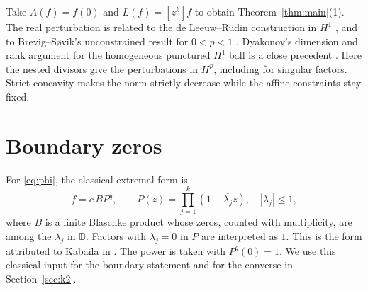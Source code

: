 \documentclass[11pt]{article}
\numberwithin{equation}{section}
\theoremstyle{remark}
\newcommand{\D}{\mathbb D}
\newcommand{\coef}[1]{[z^{#1}]}
\begin{document}
Take \(A(f)=f(0)\) and \(L(f)=\coef{k}f\) to obtain
Theorem~\ref{thm:main}(1). The real perturbation is related to the
de Leeuw--Rudin construction in \(H^1\) \cite{dLR}, and to
Brevig--S{\o}vik's unconstrained result for \(0<p<1\) \cite{Sovik}.
Dyakonov's dimension and rank argument for the homogeneous punctured
\(H^1\) ball is a close precedent \cite[Theorem~1.1 and Section~3]{Dyakonov}.
Here the nested divisors give the perturbations in \(H^p\), including for
singular factors. Strict concavity makes the norm strictly decrease
while the affine constraints stay fixed.

\section{Boundary zeros}

For \eqref{eq:phi}, the classical extremal form is
\begin{equation}\label{eq:kab}
  f=c\,B P^q,\qquad
  P(z)=\prod_{j=1}^k(1-\overline{\lambda_j}z),
  \quad |\lambda_j|\le1 ,
\end{equation}
where \(B\) is a finite Blaschke product whose zeros, counted with
multiplicity, are among the \(\lambda_j\) in \(\D\). Factors with
\(\lambda_j=0\) in \(P\) are interpreted as \(1\).
This is the form attributed to Kabaila in \cite[Lemma~4]{BGI}. The
power is taken with \(P^q(0)=1\). We use this classical input for the
boundary statement and for the converse in Section~\ref{sec:k2}.
\end{document}
